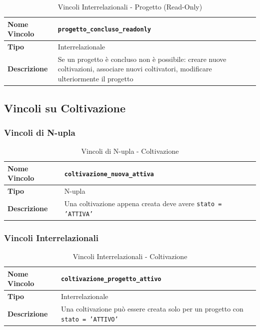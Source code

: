 \documentclass[12pt,a4paper]{article}
\begin{document}
\begin{table}[H]
\centering
\caption{Vincoli Interrelazionali - Progetto (Read-Only)}
\begin{tabularx}{\textwidth}{|l|X|}
\hline
\textbf{Nome Vincolo} & \texttt{progetto\_concluso\_readonly} \\
\hline
\textbf{Tipo} & Interrelazionale \\
\hline
\textbf{Descrizione} & Se un progetto è concluso non è possibile: creare nuove coltivazioni, associare nuovi coltivatori, modificare ulteriormente il progetto \\
\hline
\end{tabularx}
\end{table}

\subsection{Vincoli su Coltivazione}

\subsubsection{Vincoli di N-upla}

\begin{table}[H]
\centering
\caption{Vincoli di N-upla - Coltivazione}
\begin{tabularx}{\textwidth}{|l|X|}
\hline
\textbf{Nome Vincolo} & \texttt{coltivazione\_nuova\_attiva} \\
\hline
\textbf{Tipo} & N-upla \\
\hline
\textbf{Descrizione} & Una coltivazione appena creata deve avere \texttt{stato = 'ATTIVA'} \\
\hline
\end{tabularx}
\end{table}

\subsubsection{Vincoli Interrelazionali}

\begin{table}[H]
\centering
\caption{Vincoli Interrelazionali - Coltivazione}
\begin{tabularx}{\textwidth}{|l|X|}
\hline
\textbf{Nome Vincolo} & \texttt{coltivazione\_progetto\_attivo} \\
\hline
\textbf{Tipo} & Interrelazionale \\
\hline
\textbf{Descrizione} & Una coltivazione può essere creata solo per un progetto con \texttt{stato = 'ATTIVO'} \\
\hline
\end{tabularx}
\end{table}
\end{document}
